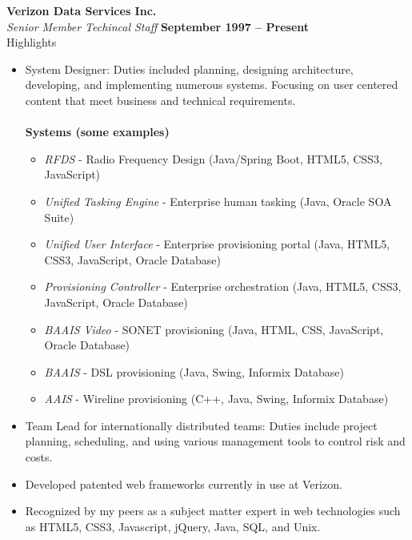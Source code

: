 \documentclass[margin,line]{resume}
\begin{document}
\begin{resume}
    \textbf{\listing Verizon Data Services Inc.} \vspace{2mm}\\\vspace{1mm}%
    \textsl{Senior Member Techincal Staff} \hfill \textbf{September 1997 -- Present}\\
    \textsf{\textmd{Highlights}}\\
    \begin{itemize}
    \item System Designer: Duties included planning, designing architecture, developing, and implementing numerous systems. Focusing on user centered content that meet business and technical requirements.\\\\
      \textbf{Systems \textmd{(some examples)}}
      \begin{itemize}
      \item \textsl{RFDS} - Radio Frequency Design \hfill (Java/Spring Boot, HTML5, CSS3, JavaScript)
      \item \textsl{Unified Tasking Engine} - Enterprise human tasking \hfill (Java, Oracle SOA Suite)
      \item \textsl{Unified User Interface} - Enterprise provisioning portal \hfill (Java, HTML5, CSS3, JavaScript, Oracle Database)
      \item \textsl{Provisioning Controller} - Enterprise orchestration \hfill (Java, HTML5, CSS3, JavaScript, Oracle Database)
      \item \textsl{BAAIS Video} - SONET provisioning \hfill (Java, HTML, CSS, JavaScript, Oracle Database)
      \item \textsl{BAAIS} - DSL provisioning \hfill (Java, Swing, Informix Database)
      \item \textsl{AAIS} - Wireline provisioning \hfill (C++, Java, Swing, Informix Database)
      \end{itemize}
      \item Team Lead for internationally distributed teams: Duties include project planning, scheduling, and using various management tools to control risk and costs.
      \item Developed patented web frameworks currently in use at Verizon.
      \item Recognized by my peers as a subject matter expert in web technologies such as HTML5, CSS3, Javascript, jQuery, Java, SQL, and Unix.
    \end{itemize}


\end{resume}
\end{document}
